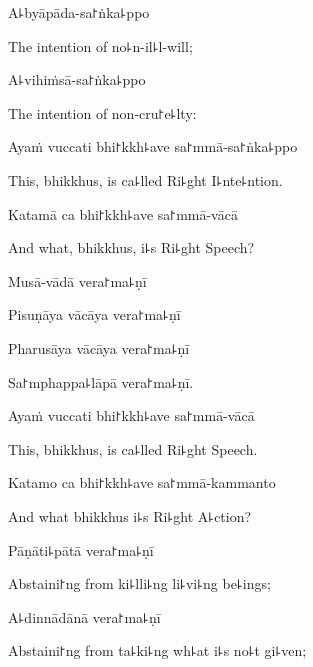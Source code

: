 A꜕byāpāda-sa꜓ṅka꜕ppo

\begin{english}
  The intention of no꜕n-il꜕l-will;
\end{english}

A꜕vihiṁsā-sa꜓ṅka꜕ppo

\begin{english}
  The intention of non-cru꜓e꜕lty:
\end{english}

Ayaṁ vuccati bhi꜓kkh꜕ave sa꜓mmā-sa꜓ṅka꜕ppo

\begin{english}
  This, bhikkhus, is ca꜕lled Ri꜕ght I꜕nte꜕ntion.
\end{english}

Katamā ca bhi꜓kkh꜕ave sa꜓mmā-vācā

\begin{english}
  And what, bhikkhus, i꜕s Ri꜕ght Speech?
\end{english}

Musā-vādā vera꜓ma꜕ṇī


Pisuṇāya vācāya vera꜓ma꜕ṇī


Pharusāya vācāya vera꜓ma꜕ṇī


Sa꜓mphappa꜕lāpā vera꜓ma꜕ṇī.


\ifaivedition
\clearpage
\fi

Ayaṁ vuccati bhi꜓kkh꜕ave sa꜓mmā-vācā

\begin{english}
  This, bhikkhus, is ca꜕lled Ri꜕ght Speech.
\end{english}

Katamo ca bhi꜓kkh꜕ave sa꜓mmā-kammanto

\begin{english}
  And what bhikkhus i꜕s Ri꜕ght A꜕ction?
\end{english}

Pāṇāti꜕pātā vera꜓ma꜕ṇī

\begin{english}
  Abstaini꜓ng from ki꜕lli꜕ng li꜕vi꜕ng be꜕ings;
\end{english}

A꜕dinnādānā vera꜓ma꜕ṇī

\begin{english}
  Abstaini꜓ng from ta꜕ki꜕ng wh꜕at i꜕s no꜕t gi꜕ven;
\end{english}

